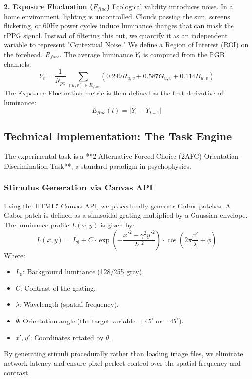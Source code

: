 \documentclass[journal]{IEEEtran}
\begin{document}
\textbf{2. Exposure Fluctuation ($E_{fluc}$)}
Ecological validity introduces noise. In a home environment, lighting is uncontrolled. Clouds passing the sun, screens flickering, or 60Hz power cycles induce luminance changes that can mask the rPPG signal. Instead of filtering this out, we quantify it as an independent variable to represent "Contextual Noise."
We define a Region of Interest (ROI) on the forehead, $R_{fore}$. The average luminance $Y_t$ is computed from the RGB channels:
\begin{equation}
    Y_t = \frac{1}{N_{px}} \sum_{(u,v) \in R_{fore}} (0.299R_{u,v} + 0.587G_{u,v} + 0.114B_{u,v})
\end{equation}
The Exposure Fluctuation metric is then defined as the first derivative of luminance:
\begin{equation}
    E_{fluc}(t) = | Y_t - Y_{t-1} |
\end{equation}

\subsection{Technical Implementation: The Task Engine}
The experimental task is a **2-Alternative Forced Choice (2AFC) Orientation Discrimination Task**, a standard paradigm in psychophysics.

\subsubsection{Stimulus Generation via Canvas API}
Using the HTML5 Canvas API, we procedurally generate Gabor patches. A Gabor patch is defined as a sinusoidal grating multiplied by a Gaussian envelope. The luminance profile $L(x,y)$ is given by:
\begin{equation}
    L(x,y) = L_0 + C \cdot \exp\left(-\frac{x'^2 + \gamma^2 y'^2}{2\sigma^2}\right) \cdot \cos\left(2\pi \frac{x'}{\lambda} + \phi\right)
\end{equation}
Where:
\begin{itemize}
    \item $L_0$: Background luminance (128/255 gray).
    \item $C$: Contrast of the grating.
    \item $\lambda$: Wavelength (spatial frequency).
    \item $\theta$: Orientation angle (the target variable: $+45^\circ$ or $-45^\circ$).
    \item $x', y'$: Coordinates rotated by $\theta$.
\end{itemize}
By generating stimuli procedurally rather than loading image files, we eliminate network latency and ensure pixel-perfect control over the spatial frequency and contrast.
\end{document}
